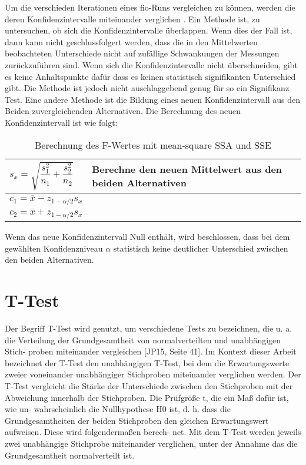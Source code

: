 Um die verschieden Iterationen eines fio-Runs vergleichen zu können, werden die deren Konfidenzintervalle miteinander verglichen \cite{statistically_rigorous}.
Ein Methode ist, zu untersuchen, ob sich die Konfidenzintervalle überlappen. Wenn dies der Fall ist, dann kann nicht
geschlussfolgert werden, dass die in den Mittelwerten beobachteten Unterschiede
nicht auf zufällige Schwankungen der Messungen zurückzuführen sind.
Wenn sich die Konfidenzintervalle nicht überschneiden, gibt es keine Anhaltspunkte dafür
dass es keinen statistisch signifikanten Unterschied gibt. Die Methode ist jedoch nicht auschlaggebend genug für so ein Signifikanz Test.
Eine andere Methode ist die Bildung eines neuen Konfidenzintervall aus den Beiden zuvergleichenden Alternativen.
Die Berechnung des neuen Konfidenzintervall ist wie folgt:

\begin{center}
  \begin{table}[h!]
    \begin{tabularx}{\textwidth}{|X|X|}
      \hline
       $s_x =  \sqrt{\dfrac{s^2_1}{n_1} + \dfrac{s^2_2}{n_2}}$ & Berechne den neuen Mittelwert aus den beiden Alternativen  \\ 
      \hline
      $c_1 = \overline{x} - z_{1-\alpha/2} s_x$ \\
      $c_2 = \overline{x} + z_{1-\alpha/2} s_x$ 
    \end{tabularx}
    \caption{Berechnung des F-Wertes mit mean-square SSA und SSE}
    \label{tab:two_Iteration_Konfidenzintervall}
  \end{table}
\end{center}

Wenn das neue Konfidenzintervall Null enthält, wird beschlossen,
dass bei dem gewählten Konfidenzniveau $\alpha$ statistisch keine
deutlicher Unterschied zwischen den beiden Alternativen.

\section{T-Test}
Der Begriff T-Test wird genutzt, um verschiedene Tests zu bezeichnen, die
u. a. die Verteilung der Grundgesamtheit von normalverteilten und unabhängigen Stich-
proben miteinander vergleichen [JP15, Seite 41]. Im Kontext dieser Arbeit bezeichnet
der T-Test den unabhängigen T-Test, bei dem die Erwartungswerte zweier voneinander
unabhängiger Stichproben miteinander verglichen werden.
Der T-Test vergleicht die Stärke der Unterschiede zwischen den Stichproben mit der
Abweichung innerhalb der Stichproben. Die Prüfgröße t, die ein Maß dafür ist, wie un-
wahrscheinlich die Nullhypothese H0 ist, d. h. dass die Grundgesamtheiten der beiden
Stichproben den gleichen Erwartungswert aufweisen. Diese wird folgendermaßen berech-
net.
Mit dem T-Test werden jeweils zwei unabhängige Stichprobe miteinander verglichen, 
unter der Annahme das die Grundgesamtheit normalverteilt ist.

